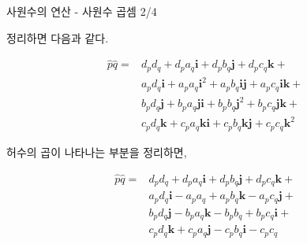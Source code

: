 \begin{frame}[fragile]{사원수의 연산 - 사원수 곱셈 2/4}

정리하면 다음과 같다. 

\begin{eqnarray}
\hat{p}\hat{q} = &
d_p d_q + d_p a_q{\mathbf i} + d_p b_q{\mathbf j} + d_p c_q{\mathbf k} + \\ \nonumber
& a_p d_q{\mathbf i}  + a_p a_q {\mathbf i}^2 + a_p b_q{\mathbf i} {\mathbf j} + a_p c_q {\mathbf i}  {\mathbf k} + \\ \nonumber
& b_p d_q {\mathbf j} + b_p a_q {\mathbf j} {\mathbf i} + b_p b_q{\mathbf j}^2 + b_p c_q {\mathbf j} {\mathbf k} + \\ \nonumber
& c_p d_q{\mathbf k}  + c_p a_q{\mathbf k} {\mathbf i} + c_p b_q{\mathbf k} {\mathbf j} + c_p c_q {\mathbf k}^2
\end{eqnarray}

허수의 곱이 나타나는 부분을 정리하면,

\begin{eqnarray}
\hat{p}\hat{q} = &
d_p d_q + d_p a_q{\mathbf i} + d_p b_q{\mathbf j} + d_p c_q{\mathbf k} + \\ \nonumber
& a_p d_q{\mathbf i}  - a_p a_q + a_p b_q{\mathbf k} - a_p c_q {\mathbf j} + \\ \nonumber
& b_p d_q {\mathbf j} - b_p a_q {\mathbf k} - b_p b_q + b_p c_q {\mathbf i} + \\ \nonumber
& c_p d_q {\mathbf k}  + c_p a_q{\mathbf j} - c_p b_q{\mathbf i} - c_p c_q 
\end{eqnarray}


\end{frame}


